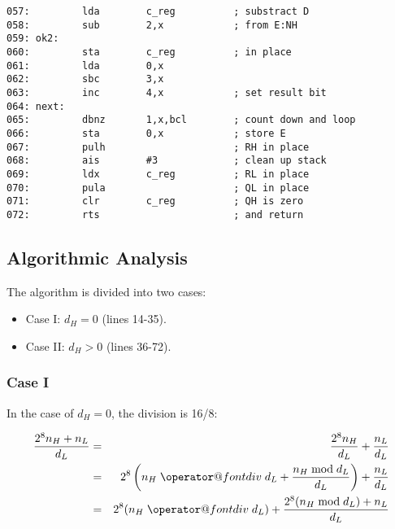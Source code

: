 \documentclass[letterpaper,10pt,titlepage]{article}
\makeatletter
\def\bdiv{%
  \nonscript\mskip-\medmuskip\mkern5mu%
  \mathbin{\operator@font div}\penalty900\mkern5mu%
  \nonscript\mskip-\medmuskip}
\makeatother
\begin{document}
\begin{verbatim}
057:         lda        c_reg          ; substract D
058:         sub        2,x            ; from E:NH
059: ok2:
060:         sta        c_reg          ; in place
061:         lda        0,x
062:         sbc        3,x
063:         inc        4,x            ; set result bit
064: next:
065:         dbnz       1,x,bcl        ; count down and loop
066:         sta        0,x            ; store E
067:         pulh                      ; RH in place
068:         ais        #3             ; clean up stack
069:         ldx        c_reg          ; RL in place
070:         pula                      ; QL in place
071:         clr        c_reg          ; QH is zero
072:         rts                       ; and return
\end{verbatim}



\subsection{Algorithmic Analysis}
\label{saec0:saan0}

The algorithm is divided into two cases:

\begin{itemize}
\item Case I:  $d_H = 0$ (lines 14-35).
\item Case II: $d_H > 0$ (lines 36-72).
\end{itemize} 

 

\subsubsection{Case I}
\label{saec0:saan0:scas0}

In the case of $d_H = 0$, the division is 16/8:

\begin{eqnarray}
\label{eq:saec0:saan0:scas0:01}
\frac{2^8 n_H + n_L}{d_L} & = & \frac{2^8 n_H}{d_L} + \frac{n_L}{d_L} \\
\label{eq:saec0:saan0:scas0:02}
& = & 2^8 \left( n_H \bdiv d_L + \frac{n_H \bmod d_L}{d_L} \right) + \frac{n_L}{d_L} \\
\label{eq:saec0:saan0:scas0:03}
& = & 2^8 (n_H \bdiv d_L) + \frac{2^8 (n_H \bmod d_L) + n_L}{d_L}
\end{eqnarray}
\end{document}

